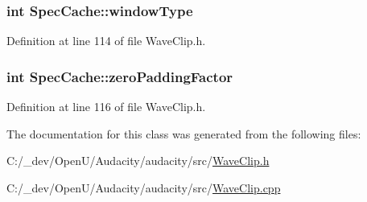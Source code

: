\subsubsection[{\texorpdfstring{window\+Type}{windowType}}]{ {\bf int} Spec\+Cache\+::window\+Type}\hypertarget{class_spec_cache_a4793162593d06c2ecb0c436d90750be6}{}\label{class_spec_cache_a4793162593d06c2ecb0c436d90750be6}


Definition at line 114 of file Wave\+Clip.\+h.

\subsubsection[{\texorpdfstring{zero\+Padding\+Factor}{zeroPaddingFactor}}]{ {\bf int} Spec\+Cache\+::zero\+Padding\+Factor}\hypertarget{class_spec_cache_a0b479cafb187b31e32196e97601aeb49}{}\label{class_spec_cache_a0b479cafb187b31e32196e97601aeb49}


Definition at line 116 of file Wave\+Clip.\+h.



The documentation for this class was generated from the following files\+:\begin{DoxyCompactItemize}
\item 
C\+:/\+\_\+dev/\+Open\+U/\+Audacity/audacity/src/\hyperlink{_wave_clip_8h}{Wave\+Clip.\+h}\item 
C\+:/\+\_\+dev/\+Open\+U/\+Audacity/audacity/src/\hyperlink{_wave_clip_8cpp}{Wave\+Clip.\+cpp}\end{DoxyCompactItemize}
